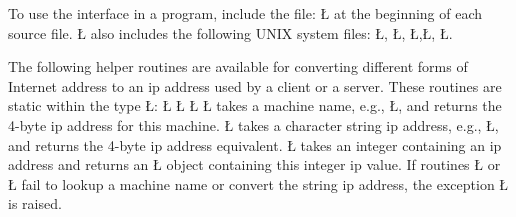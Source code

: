 \documentclass[openright,twoside]{report}
\begin{document}
\begin{sloppypar}
To use the interface in a \uC program, include the file:
\LGinlinefalse\LGbegin\lgrinde
\L{}
\endlgrinde\LGend
{}%
at the beginning of each source file.
\LGinlinetrue\LGbegin\lgrinde\L{}\endlgrinde\LGend{} also includes the following UNIX system files: \LGinlinetrue\LGbegin\lgrinde\L{}\endlgrinde\LGend{}, \LGinlinetrue\LGbegin\lgrinde\L{}\endlgrinde\LGend{}, \LGinlinetrue\LGbegin\lgrinde\L{}\endlgrinde\LGend{},\LGinlinetrue\LGbegin\lgrinde\L{}\endlgrinde\LGend{}, \LGinlinetrue\LGbegin\lgrinde\L{}\endlgrinde\LGend{}.
\end{sloppypar}

The following helper routines are available for converting different forms of Internet address to an ip address used by a client or a server.
These routines are static within the type \LGinlinetrue\LGbegin\lgrinde\L{}\endlgrinde\LGend{}:
\LGinlinefalse\LGbegin\lgrinde
\L{}
\L{}
\L{}
\endlgrinde\LGend
{}%
%
%
\LGinlinetrue\LGbegin\lgrinde\L{}\endlgrinde\LGend{} takes a machine name, e.g., \LGinlinetrue\LGbegin\lgrinde\L{}\endlgrinde\LGend{}, and returns the 4-byte ip address for this machine.
\LGinlinetrue\LGbegin\lgrinde\L{}\endlgrinde\LGend{} takes a character string ip address, e.g., \LGinlinetrue\LGbegin\lgrinde\L{}\endlgrinde\LGend{}, and returns the 4-byte ip address equivalent.
\LGinlinetrue\LGbegin\lgrinde\L{}\endlgrinde\LGend{} takes an integer containing an ip address and returns an \LGinlinetrue\LGbegin\lgrinde\L{}\endlgrinde\LGend{} object containing this integer ip value.
If routines \LGinlinetrue\LGbegin\lgrinde\L{}\endlgrinde\LGend{} or \LGinlinetrue\LGbegin\lgrinde\L{}\endlgrinde\LGend{} fail to lookup a machine name or convert the string ip address, the exception \LGinlinetrue\LGbegin\lgrinde\L{}\endlgrinde\LGend{} is raised.
\end{document}
